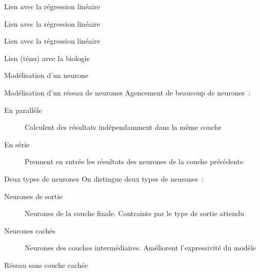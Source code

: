 \begin{frame}{Lien avec la régression linéaire}
\end{frame}

\begin{frame}{Lien avec la régression linéaire}
\end{frame}

\begin{frame}{Lien avec la régression linéaire}
\end{frame}

\begin{frame}{Lien (ténu) avec la biologie}
\end{frame}

\begin{frame}{Modélisation d'un neurone}
\end{frame}

\begin{frame}{Modélisation d'un réseau de neurones}
  Agencement de beaucoup de neurones~:
  \begin{description}
    \item[En parallèle] Calculent des résultats indépendamment dans la même couche
    \item[En série] Prennent en entrée les résultats des neurones de la couche précédente
  \end{description}
\end{frame}

\begin{frame}{Deux types de neurones}
  On distingue deux types de neurones~:
  \begin{description}
    \item[Neurones de sortie] Neurones de la couche finale. Contraints par le type de sortie attendu
    \item[Neurones cachés] Neurones des couches intermédiaires. Améliorent l'expressivité du modèle
  \end{description}
\end{frame}

\begin{frame}{Réseau sans couche cachée}
  \centering
\end{frame}

